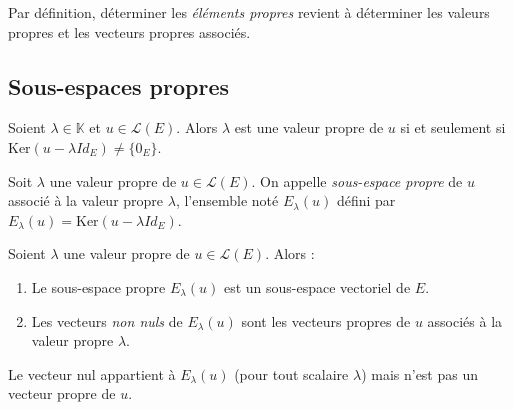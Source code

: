 \documentclass[a4paper,10pt]{report}
\begin{document}
\begin{rem} Par définition, déterminer les \textit{éléments propres} revient à déterminer les valeurs propres et les vecteurs propres associés.
\end{rem}

\subsection{Sous-espaces propres}

\begin{prop} Soient $\lambda \in \mathbb{K}$ et $u \in \mathcal{L}(E)$. Alors $\lambda$ est une valeur propre de $u$ si et seulement si $\textrm{Ker}(u- \lambda Id_E) \neq \lbrace 0_E \rbrace$.
\end{prop}

\begin{preuve}

\vspace{3cm}
\end{preuve} 

\begin{defin} Soit $\lambda$ une valeur propre de $u \in \mathcal{L}(E)$. On appelle \textit{sous-espace propre} de $u$ associé à la valeur propre $\lambda$, l'ensemble noté $E_{\lambda}(u)$ défini par $E_{\lambda}(u)=\textrm{Ker}(u- \lambda Id_E)$.
\end{defin}

\begin{prop} Soient $\lambda$ une valeur propre de $u \in \mathcal{L}(E)$. Alors :

\begin{enumerate}
\item Le sous-espace propre $E_{\lambda}(u)$ est un sous-espace vectoriel de $E$.
\item  Les vecteurs \textit{non nuls} de $E_{\lambda}(u)$ sont les vecteurs propres de $u$ associés à la valeur propre $\lambda$.
\end{enumerate} 
\end{prop}

\begin{preuve}

\vspace{3cm}
\end{preuve}

\begin{att} Le vecteur nul appartient à $E_{\lambda}(u)$ (pour tout scalaire $\lambda$) mais n'est pas un vecteur propre de $u$.
\end{att}
\end{document}
